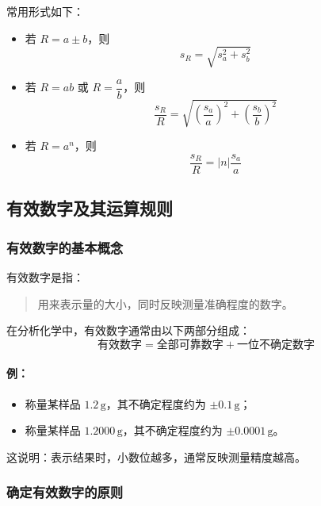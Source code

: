 \documentclass[12pt,a4paper]{article}
\numberwithin{equation}{section}
\begin{document}
常用形式如下：
\begin{itemize}
    \item 若 \(R=a\pm b\)，则
\begin{equation}
s_R=\sqrt{s_a^2+s_b^2}
\end{equation}

    \item 若 \(R=ab\) 或 \(R=\dfrac{a}{b}\)，则
\begin{equation}
\frac{s_R}{R}=\sqrt{\left(\frac{s_a}{a}\right)^2+\left(\frac{s_b}{b}\right)^2}
\end{equation}

    \item 若 \(R=a^n\)，则
\begin{equation}
\frac{s_R}{R}=|n|\frac{s_a}{a}
\end{equation}
\end{itemize}

\subsection{有效数字及其运算规则}

\subsubsection{有效数字的基本概念}

有效数字是指：
\begin{quote}
用来表示量的大小，同时反映测量准确程度的数字。
\end{quote}

在分析化学中，有效数字通常由以下两部分组成：
\begin{equation}
\text{有效数字}=\text{全部可靠数字}+\text{一位不确定数字}
\end{equation}

\paragraph{例：}
\begin{itemize}
    \item 称量某样品 $1.2\,\mathrm{g}$，其不确定程度约为 $\pm 0.1\,\mathrm{g}$；
    \item 称量某样品 $1.2000\,\mathrm{g}$，其不确定程度约为 $\pm 0.0001\,\mathrm{g}$。
\end{itemize}

这说明：表示结果时，小数位越多，通常反映测量精度越高。

\subsubsection{确定有效数字的原则}
\end{document}
